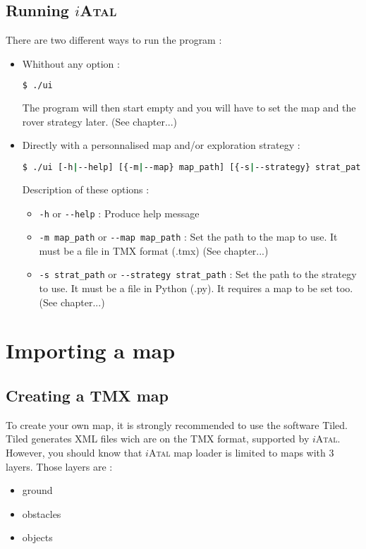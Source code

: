 \documentclass[a4paper,11pt]{article}
\newcommand\iAtal{$i$\textsc{Atal}}
\begin{document}
\subsection{Running \iAtal{}}
There are two different ways to run the program :
\begin{itemize}
\item Whithout any option :
\begin{lstlisting}[language=sh]
$ ./ui
\end{lstlisting}
  The program will then start empty and you will have to set the map
  and the rover strategy later. (See chapter...)
  
\item Directly with a personnalised map and/or exploration strategy :
\begin{lstlisting}[language=sh]
$ ./ui [-h|--help] [{-m|--map} map_path] [{-s|--strategy} strat_path]
\end{lstlisting}
  Description of these options :
  \begin{itemize}
  \item \verb!-h! or \verb!--help! : Produce help message
  \item \verb!-m map_path! or \verb!--map map_path! : Set the path to
    the map to use. It must be a file in TMX format (.tmx) (See
    chapter...)
  \item \verb!-s strat_path! or \verb!--strategy strat_path! : Set the
    path to the strategy to use. It must be a file in Python (.py). It
    requires a map to be set too. (See chapter...)
  \end{itemize}
\end{itemize}

\section{Importing a map}

\subsection{Creating a TMX map}

To create your own map, it is strongly recommended to use the software
Tiled\cite{tiled}.  Tiled generates XML files wich are on the TMX
format, supported by \iAtal{}. However, you should know that \iAtal{} map
loader is limited to maps with 3 layers. Those layers are :
\begin{itemize}
 \item ground
 \item obstacles
 \item objects
\end{itemize}
\label{avaibleLayers}
\end{document}
